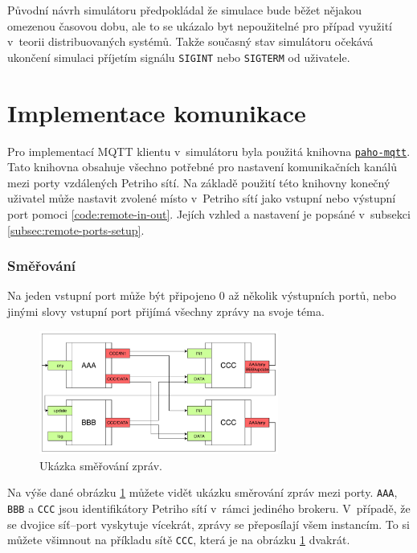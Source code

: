 Původní návrh simulátoru předpokládal že simulace bude běžet nějakou omezenou časovou dobu, ale to se ukázalo byt nepoužitelné pro případ využití v~teorii distribuovaných systémů. Takže současný stav simulátoru očekává ukončení simulaci příjetím signálu \texttt{SIGINT} nebo \texttt{SIGTERM} od uživatele.

\section{Implementace komunikace}
\label{sec:mqtt_impl}

Pro implementací MQTT klientu v~simulátoru byla použitá knihovna \href{https://pypi.org/project/paho-mqtt/}{\texttt{paho-mqtt}}. Tato knihovna obsahuje všechno potřebné pro nastavení komunikačních kanálů mezi porty vzdálených Petriho sítí. Na základě použití této knihovny konečný uživatel může nastavit zvolené místo v~Petriho sítí jako vstupní nebo výstupní port pomoci \ref{code:remote-in-out}. Jejích vzhled a nastavení je popsáné v~subsekci \ref{subsec:remote-ports-setup}.


\subsubsection{Směřování}
\label{subsec:mqtt-routing}

Na jeden vstupní port může být připojeno 0 až několik výstupních portů, nebo jinými slovy vstupní port přijímá všechny zprávy na svoje téma.

\begin{figure}[htb]
  \centering
  \includegraphics[width=0.7\textwidth]{obrazky-figures/Port-routing.pdf}
  \caption{Ukázka směřování zpráv.}
  \label{route-viz}
\end{figure}

Na výše dané obrázku \ref{route-viz} můžete vidět ukázku směrování zpráv mezi porty. \texttt{AAA}, \texttt{BBB} a \texttt{CCC} jsou identifikátory Petriho sítí v~rámci jediného brokeru. V~případě, že se dvojice síť--port  vyskytuje vícekrát, zprávy se přeposílají všem instancím. To si můžete všimnout na příkladu sítě \texttt{CCC}, která je na obrázku \ref{route-viz} dvakrát.

